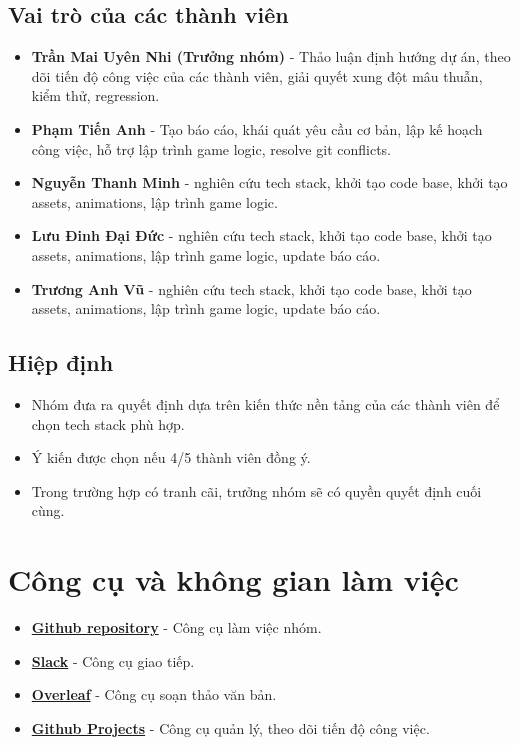 \documentclass[a4paper, 12pt]{article}
\begin{document}
\subsection{Vai trò của các thành viên}
\begin{itemize}
    \item \textbf{Trần Mai Uyên Nhi (Trưởng nhóm)} - Thảo luận định hướng dự án, theo dõi tiến độ công việc của các thành viên, giải quyết xung đột mâu thuẫn, kiểm thử, regression.
    \item \textbf{Phạm Tiến Anh} - Tạo báo cáo, khái quát yêu cầu cơ bản, lập kế hoạch công việc, hỗ trợ lập trình game logic, resolve git conflicts.
    \item \textbf{Nguyễn Thanh Minh} - nghiên cứu tech stack, khởi tạo code base, khởi tạo assets, animations, lập trình game logic.
    \item \textbf{Lưu Đinh Đại Đức} - nghiên cứu tech stack, khởi tạo code base, khởi tạo assets, animations, lập trình game logic, update báo cáo.
    \item \textbf{Trương Anh Vũ} - nghiên cứu tech stack, khởi tạo code base, khởi tạo assets, animations, lập trình game logic, update báo cáo.
\end{itemize}

\subsection{Hiệp định}
\begin{itemize}
    \item Nhóm đưa ra quyết định dựa trên kiến thức nền tảng của các thành viên để chọn tech stack phù hợp.
    \item Ý kiến được chọn nếu 4/5 thành viên đồng ý.
    \item Trong trường hợp có tranh cãi, trưởng nhóm sẽ có quyền quyết định cuối cùng.
\end{itemize}

\section{Công cụ và không gian làm việc}
\begin{itemize}
    \item \href{https://github.com/UIT-24730009/SnakeGame}{\large \textbf{Github repository}} - Công cụ làm việc nhóm.
    \item \href{https://app.slack.com/client/T07Q56DLLUX/C07U74U2XGF}{\large \textbf{Slack}} - Công cụ giao tiếp.
    \item \href{https://www.overleaf.com/project/67271c85e33c6e0dfe041c9d}{\large \textbf{Overleaf}} - Công cụ soạn thảo văn bản.
    \item \href{https://github.com/users/UIT-24730009/projects/1/views/1}{\large \textbf{Github Projects}} - Công cụ quản lý, theo dõi tiến độ công việc.
\end{itemize}
\end{document}
